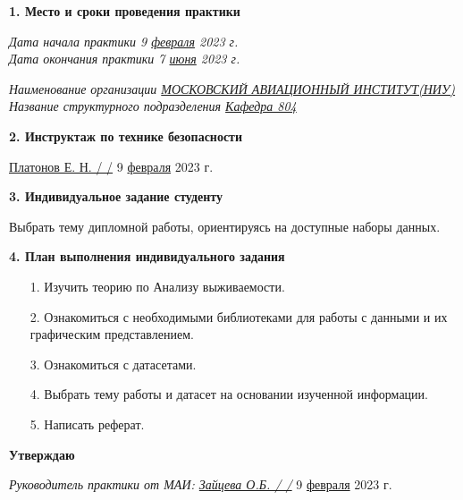 \textbf{1. Место и сроки проведения практики}

\vspace{20pt}

{\em Дата начала практики \hspace{3cm} 9 \underline{февраля} 2023 г.} \\

{\em Дата окончания практики \hspace{3cm} 7 \underline{июня} 2023 г.}

\vspace{20pt}

{\em Наименование организации \underline{МОСКОВСКИЙ АВИАЦИОННЫЙ ИНСТИТУТ(НИУ)}} \\

{\em Название структурного подразделения \underline{Кафедра 804}}

\vspace{20pt}

\textbf{2. Инструктаж по технике безопасности}

\vspace{10pt}

\underline{ Платонов Е. Н. / \hspace{3cm} /} \hspace{1cm} 9 \underline{февраля} 2023 г.

\vspace{10pt}

\textbf{3. Индивидуальное задание студенту}

Выбрать тему дипломной работы, ориентируясь на доступные наборы данных.

\vspace{10pt}

\textbf{4. План выполнения индивидуального задания}

\begin{itemize}
    \item[1.] Изучить теорию по Анализу выживаемости.
    \item[2.] Ознакомиться с необходимыми библиотеками для работы с данными и их графическим представлением.
    \item[3.] Ознакомиться с датасетами.
    \item[4.] Выбрать тему работы и датасет на основании изученной информации.
    \item[5.] Написать реферат.
\end{itemize}

\textbf{Утверждаю}

{\em Руководитель практики от МАИ: \underline{Зайцева О.Б. / \hspace{3cm} /}} 9 \underline{февраля} 2023 г.

